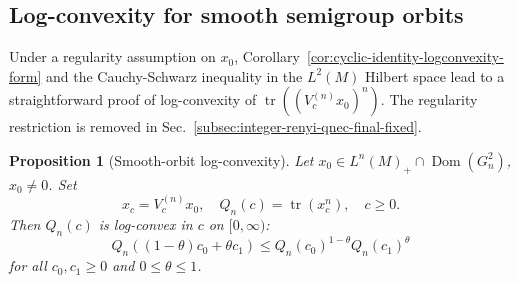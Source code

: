 \documentclass[11pt,a4paper]{article}
\theoremstyle{plain}
\numberwithin{theorem}{section}
\newtheorem{proposition}[theorem]{Proposition}
\theoremstyle{definition}
\newcommand{\?}{\overset{?}{=}}
\DeclareMathOperator{\tr}{tr}
\DeclareMathOperator{\Dom}{Dom}
\begin{document}
\subsection{Log-convexity for smooth semigroup orbits}
\label{subsec:smooth-orbit-log-convexity-fixed}

Under a regularity assumption on $x_0$, Corollary~\ref{cor:cyclic-identity-logconvexity-form} and the Cauchy-Schwarz inequality in the $L^2(M)$ Hilbert space lead to a straightforward proof of log-convexity of $\tr((V_c^{(n)}x_0)^n)$. The regularity restriction is removed in Sec.~\ref{subsec:integer-renyi-qnec-final-fixed}.
\begin{proposition}[Smooth-orbit log-convexity]
\label{prop:smooth-orbit-log-convexity-fixed}
Let $x_0\in L^n(M)_+\cap\Dom(G_n^2)$, $x_0\neq0$. Set
\[
    x_c=V_c^{(n)}x_0, \quad Q_n(c)=\tr(x_c^n), \quad c\geq0.
\]
Then $Q_n(c)$ is log-convex in $c$ on $[0,\infty)$:
\begin{equation}
    Q_n((1-\theta)c_0+\theta c_1)
  \leq Q_n(c_0)^{1-\theta}Q_n(c_1)^\theta
\end{equation}
for all $c_0,c_1\geq 0$ and $0\leq \theta\leq 1$.
\end{proposition}
\end{document}
